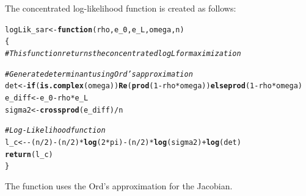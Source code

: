 \documentclass[english,12pt]{book}\usepackage[]{graphicx}\usepackage[]{xcolor}
\makeatletter
\newcommand{\hlnum}[1]{\textcolor[rgb]{0.686,0.059,0.569}{#1}}%
\newcommand{\hlcom}[1]{\textcolor[rgb]{0.678,0.584,0.686}{\textit{#1}}}%
\newcommand{\hlopt}[1]{\textcolor[rgb]{0,0,0}{#1}}%
\newcommand{\hldef}[1]{\textcolor[rgb]{0.345,0.345,0.345}{#1}}%
\newcommand{\hlkwa}[1]{\textcolor[rgb]{0.161,0.373,0.58}{\textbf{#1}}}%
\newcommand{\hlkwb}[1]{\textcolor[rgb]{0.69,0.353,0.396}{#1}}%
\newcommand{\hlkwc}[1]{\textcolor[rgb]{0.333,0.667,0.333}{#1}}%
\newcommand{\hlkwd}[1]{\textcolor[rgb]{0.737,0.353,0.396}{\textbf{#1}}}%
\newenvironment{kframe}{%
 \def\at@end@of@kframe{}%
 \ifinner\ifhmode%
  \def\at@end@of@kframe{\end{minipage}}%
  \begin{minipage}{\columnwidth}%
 \fi\fi%
 \def\FrameCommand##1{\hskip\@totalleftmargin \hskip-\fboxsep
 \colorbox{shadecolor}{##1}\hskip-\fboxsep
     \hskip-\linewidth \hskip-\@totalleftmargin \hskip\columnwidth}%
 \MakeFramed {\advance\hsize-\width
   \@totalleftmargin\z@ \linewidth\hsize
   \@setminipage}}%
 {\par\unskip\endMakeFramed%
 \at@end@of@kframe}
\newenvironment{knitrout}{}{} %
\makeatother
\begin{document}
The concentrated log-likelihood function is created as follows:
\begin{knitrout}
\color{fgcolor}\begin{kframe}
\begin{alltt}
\hldef{logLik_sar} \hlkwb{<-} \hlkwa{function}\hldef{(}\hlkwc{rho}\hldef{,} \hlkwc{e_0}\hldef{,} \hlkwc{e_L}\hldef{,} \hlkwc{omega}\hldef{,} \hlkwc{n}\hldef{)}
\hldef{\{}
  \hlcom{# This function returns the concentrated log L for maximization}

  \hlcom{#Generate determinant using Ord's approximation}
  \hldef{det}    \hlkwb{<-} \hlkwa{if} \hldef{(}\hlkwd{is.complex}\hldef{(omega))} \hlkwd{Re}\hldef{(}\hlkwd{prod}\hldef{(}\hlnum{1} \hlopt{-} \hldef{rho} \hlopt{*} \hldef{omega))} \hlkwa{else} \hlkwd{prod}\hldef{(}\hlnum{1} \hlopt{-} \hldef{rho} \hlopt{*} \hldef{omega)}
  \hldef{e_diff} \hlkwb{<-} \hldef{e_0} \hlopt{-} \hldef{rho} \hlopt{*} \hldef{e_L}
  \hldef{sigma2} \hlkwb{<-} \hlkwd{crossprod}\hldef{(e_diff)} \hlopt{/} \hldef{n}

  \hlcom{#Log-Likelihood function}
  \hldef{l_c}    \hlkwb{<-} \hlopt{-} \hldef{(n} \hlopt{/} \hlnum{2}\hldef{)} \hlopt{-} \hldef{(n} \hlopt{/} \hlnum{2}\hldef{)} \hlopt{*} \hlkwd{log}\hldef{(}\hlnum{2} \hlopt{*} \hldef{pi)} \hlopt{-} \hldef{(n} \hlopt{/} \hlnum{2}\hldef{)} \hlopt{*} \hlkwd{log}\hldef{(sigma2)} \hlopt{+} \hlkwd{log}\hldef{(det)}
  \hlkwd{return}\hldef{(l_c)}
\hldef{\}}
\end{alltt}
\end{kframe}
\end{knitrout}

The  function uses the Ord's approximation for the Jacobian. 
\end{document}
